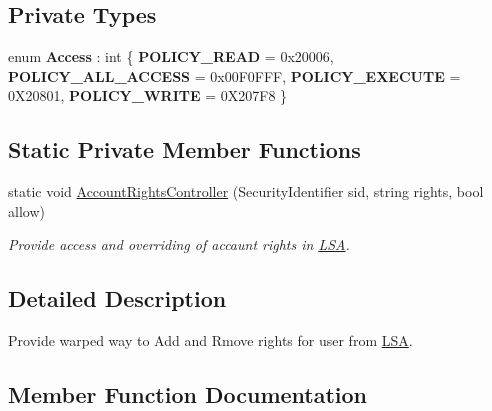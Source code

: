 \subsection*{Private Types}
\begin{DoxyCompactItemize}
\item 
\mbox{\label{class_pipes_provider_1_1_security_1_1_l_s_a_1_1_lsa_security_wrapper_ac775fcd30d378c71ec29ebe3e8efe778}} 
enum {\bfseries Access} \+: int \{ {\bfseries P\+O\+L\+I\+C\+Y\+\_\+\+R\+E\+AD} = 0x20006, 
{\bfseries P\+O\+L\+I\+C\+Y\+\_\+\+A\+L\+L\+\_\+\+A\+C\+C\+E\+SS} = 0x00\+F0\+F\+FF, 
{\bfseries P\+O\+L\+I\+C\+Y\+\_\+\+E\+X\+E\+C\+U\+TE} = 0\+X20801, 
{\bfseries P\+O\+L\+I\+C\+Y\+\_\+\+W\+R\+I\+TE} = 0\+X207\+F8
 \}
\end{DoxyCompactItemize}
\subsection*{Static Private Member Functions}
\begin{DoxyCompactItemize}
\item 
static void \mbox{\hyperlink{class_pipes_provider_1_1_security_1_1_l_s_a_1_1_lsa_security_wrapper_a13ce034059c39f7a1a93d06a45b07d94}{Account\+Rights\+Controller}} (Security\+Identifier sid, string rights, bool allow)
\begin{DoxyCompactList}\small\item\em Provide access and overriding of accaunt rights in \mbox{\hyperlink{namespace_pipes_provider_1_1_security_1_1_l_s_a}{L\+SA}}. \end{DoxyCompactList}\end{DoxyCompactItemize}


\subsection{Detailed Description}
Provide warped way to Add and Rmove rights for user from \mbox{\hyperlink{namespace_pipes_provider_1_1_security_1_1_l_s_a}{L\+SA}}. 



\subsection{Member Function Documentation}
\mbox{\label{class_pipes_provider_1_1_security_1_1_l_s_a_1_1_lsa_security_wrapper_a13ce034059c39f7a1a93d06a45b07d94}} 
